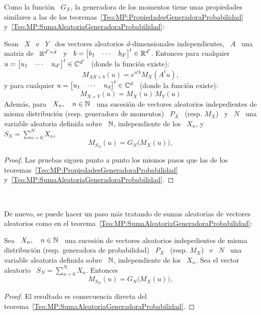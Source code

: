 Como la funci\'on \ $G_X$, la  generadora de los momentos tiene unas propiedades
similares  a las  de  los teoremas~\ref{Teo:MP:PropiedadesGeneradoraProbabilidad}
y~\ref{Teo:MP:SumaAleatoriaGeneradoraProbabilidad}:
%
\begin{teorema}%
\label{Teo:MP:PropiedadesGeneradoraMomentos}
%
  Sean  \   $X$  \  e  \   $Y$  \  dos   vectores  aleatorios  $d$-dimensionales
  independientes,  \ $A$  \ una  matriz de  \  $\mathbb{R}^{d' \times  d}$ \  y \  $b
  =   \begin{bmatrix}    b_1   &    \cdots   &   b_{d'}    \end{bmatrix}^t   \in
  \mathbb{R}^{d'}$.  Entonces para  cualquier $u  =  \begin{bmatrix} u_1  & \cdots  &
    u_{d'} \end{bmatrix}^t \in \mathbb{C}^{d'}$ \ (donde la funci\'on existe):
  \[
  M_{A X + b}(u) =  e^{u^t b} M_X\left( A^t u \right),
  \]
  y para cualquier  $u = \begin{bmatrix} u_1 & \cdots  & u_d \end{bmatrix}^t \in
  \mathbb{C}^d$ \ (donde la funci\'on existe):
  \[
  M_{X+Y}(u) = M_X(u) \, M_Y(u)
  \]
  Adem\'as,  para \  $X_n, \quad  n  \in \mathbb{N}$  \, una  sucesi\'on de  vectores
  aleatorios  indepedientes  de   misma  distribuci\'on  (resp.   generadora  de
  momentos) \ $P_X$ \ (resp. $M_X$) \  y \ $N$ \ una variable aleatoria definida
  sobre \ $\mathbb{N}$, independiente de los \ $X_n$, y \ $ S_N = \sum_{n=0}^N X_n$,
  \[
  M_{S_N}(u) =  G_N \big( M_X(u) \big),
  \]
\end{teorema}
%
\begin{proof}
  Las  pruebas  siguen   punto  a  punto  los  mismos  pasos   que  las  de  los
  teoremas~\ref{Teo:MP:PropiedadesGeneradoraProbabilidad}
  y~\ref{Teo:MP:SumaAleatoriaGeneradoraProbabilidad}.
\end{proof}

\

De nuevo, se puede hacer un  paso m\'as tratando de sumas aleatorias de vectores
aleatorios como en el teorema~\ref{Teo:MP:SumaAleatoriaGeneradoraProbabilidad}:
%
\begin{teorema}
\label{Teo:MP:SumaAleatoriaGeneradoraMomentos}
%
  Sea  \ $X_n,  \quad n  \in  \mathbb{N}$ \,  una sucesi\'on  de vectores  aleatorios
  indepedientes de  misma distribuci\'on  (resp.  generadora de  probabilidad) \
  $P_X$ \  (resp. $M_X$) \  e \  $N$ \ una  variable aleatoria definida  sobre \
  $\mathbb{N}$,  independiente de los  \ $X_n$.  Sea el  vector aleatorio  \ $  S_N =
  \sum_{n=0}^N X_n$. Entonces
  \[
  M_{S_N}(u) =  G_N \big( M_X(u) \big),
  \]
\end{teorema}
%
\begin{proof}
  El         resultado        es         consecuencia         directa        del
  teorema~\ref{Teo:MP:SumaAleatoriaGeneradoraProbabilidad}.
\end{proof}


